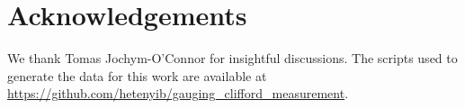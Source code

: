 \documentclass[aps,prx,twocolumn,secnumarabic,superscriptaddress,nofootinbib]{revtex4-2}
\begin{document}
\section*{Acknowledgements}

We thank Tomas Jochym-O'Connor for insightful discussions. The scripts used to generate the data for this work are available at \href{https://github.com/hetenyib/gauging_clifford_measurement}{https://github.com/hetenyib/gauging\_clifford\_measurement}.



\clearpage



\end{document}
